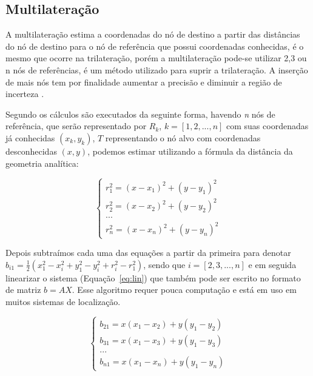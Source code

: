     \subsection{Multilateração}
    A multilateração estima a coordenadas do nó de destino a partir das distâncias do nó de destino para o nó de referência que possui coordenadas conhecidas, é o mesmo que ocorre na trilateração, porém a multilateração pode-se utilizar 2,3 ou n nós de referências, é um método utilizado para suprir a trilateração. A inserção de mais nós tem por finalidade aumentar a precisão e diminuir a região de incerteza \cite{rfid2009review}.
    \par
    Segundo  os cálculos são executados da seguinte forma, havendo \textit{n} nós de referência, que serão
    representado por $R_k$,  $k = \left[ 1, 2, ... , n \right] $ com suas coordenadas já conhecidas $( x_k, y_k )$, $T$ representando
    o nó alvo com coordenadas desconhecidas $(x,y)$, podemos estimar utilizando a fórmula da distância da geometria analítica:
    
    \begin{equation}
    \left \{ \begin{array}{c}
        r_1^2 = (x - x_1 )^2 + (y - y_1)^2  \\
        r_2^2 = (x - x_2 )^2 + (y - y_2)^2  \\
        ...  \\
        r_n^2 = (x - x_n )^2 + (y - y_n)^2
   \end{array} \right.
    \end{equation}

    \par
    Depois subtraímos cada uma das equações a partir da primeira para
    denotar $b_{i1}= \frac{1}{2}(x_1^2 - x_i^2 + y_1^2 -y_i^2 + r_i^2 - r_1^2)$, sendo que $i = [2,3, ..., n]$ e em seguida
    linearizar o sistema (Equação~\ref{eq:lin})
     que também pode ser escrito no formato de matriz $b = AX$. Esse algoritmo requer pouca computação e está em uso em muitos sistemas de localização.    

    
    \begin{equation}
    \left \{  \begin{array}{c}
        b_{21} = x(x_1 - x_2) + y(y_1 - y_2)  \\
        b_{31} = x(x_1 - x_3) + y(y_1 - y_3)  \\
        ...  \\
        b_{n1} = x(x_1 - x_n) + y(y_1 - y_n)
   \end{array} \right.
        \label{eq:lin}
    \end{equation}


